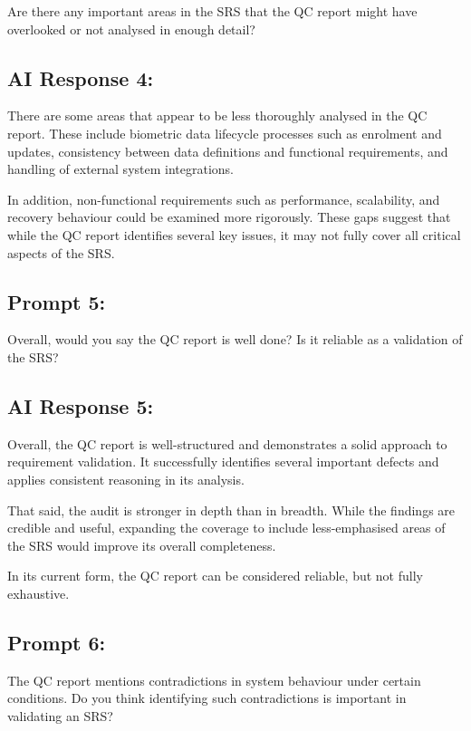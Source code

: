 \documentclass[11pt,a4paper]{article}
\begin{document}
Are there any important areas in the SRS that the QC report might have overlooked or not analysed in enough detail?

\subsection*{AI Response 4:}

There are some areas that appear to be less thoroughly analysed in the QC report. These include biometric data lifecycle processes such as enrolment and updates, consistency between data definitions and functional requirements, and handling of external system integrations.

In addition, non-functional requirements such as performance, scalability, and recovery behaviour could be examined more rigorously. These gaps suggest that while the QC report identifies several key issues, it may not fully cover all critical aspects of the SRS.

\subsection*{Prompt 5:}

Overall, would you say the QC report is well done? Is it reliable as a validation of the SRS?

\subsection*{AI Response 5:}

Overall, the QC report is well-structured and demonstrates a solid approach to requirement validation. It successfully identifies several important defects and applies consistent reasoning in its analysis.

That said, the audit is stronger in depth than in breadth. While the findings are credible and useful, expanding the coverage to include less-emphasised areas of the SRS would improve its overall completeness.

In its current form, the QC report can be considered reliable, but not fully exhaustive.

\subsection*{Prompt 6:}

The QC report mentions contradictions in system behaviour under certain conditions. Do you think identifying such contradictions is important in validating an SRS?
\end{document}
